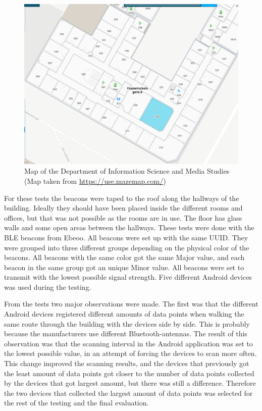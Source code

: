 \documentclass[../Main/thesis.tex]{subfiles}
\begin{document}
\begin{figure}[h]
	\centering
	\includegraphics[width=\textwidth]{../fig/infomedia-map}
	\caption[Map of the Department of Information Science and Media Studies]{Map of the Department of Information Science and Media Studies \small(Map taken from \url{https://use.mazemap.com/})}
	\label{fig:infomedia-map}
\end{figure}

For these tests the beacons were taped to the roof along the hallways of the building.
Ideally they should have been placed inside the different rooms and offices, but that was not possible as the rooms are in use.
The floor has glass walls and some open areas between the hallways.
These tests were done with the BLE beacons from Ebeoo.
All beacons were set up with the same UUID. 
They were grouped into three different groups depending on the physical color of the beacons.
All beacons with the same color got the same Major value, and each beacon in the same group got an unique Minor value.
All beacons were set to transmit with the lowest possible signal strength.
Five different Android devices was used during the testing.

From the tests two major observations were made.
The first was that the different Android devices registered different amounts of data points when walking the same route through the building with the devices side by side.
This is probably because the manufacturers use different Bluetooth-antennas. 
The result of this observation was that the scanning interval in the Android application was set to the lowest possible value, in an attempt of forcing the devices to scan more often.
This change improved the scanning results, and the devices that previously got the least amount of data points got closer to the number of data points collected by the devices that got largest amount, but there was still a difference.
Therefore the two devices that collected the largest amount of data points was selected for the rest of the testing and the final evaluation.
\end{document}
